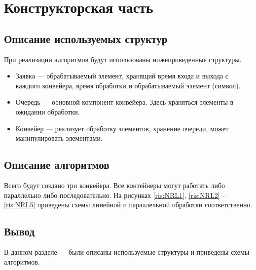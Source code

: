\chapter{Конструкторская часть}

\section{Описание используемых структур}
При реализации алгоритмов будут использованы нижеприведенные структуры.
\begin{itemize}
	\item Заявка --- обрабатываемый элемент, хранящий время входа и выхода с каждого конвейера, время обработки и обрабатываемый элемент (символ).
	\item Очередь ---  основной компонент конвейера. Здесь храняться элементы в ожидании обработки.
	\item Конвейер ---  реализует обработку элементов, хранение очереди, может манипулировать элементами.
\end{itemize} 

\section{Описание алгоритмов}
Всего будут создано три конвейера. Все контейнеры могут работать либо параллельно либо последовательно.
На рисунках \ref{ris:NRL1}, \ref{ris:NRL2} -- \ref{ris:NRL5} приведены схемы линейной и параллельной обработки соответственно.  
\begin{center}	
\newpage
	\centering
	\def\svgwidth{12cm}
	
	\label{ris:NRL1}
\end{center}
\begin{center}	
	\centering
	\def\svgwidth{5cm}
	
	\label{ris:NRL2}
\end{center}
\begin{center}	
	\newpage
	\centering
	\def\svgwidth{11cm}
	
	\label{ris:NRL3}
\end{center}
\begin{center}	
	\centering
	\def\svgwidth{11cm}
	
	\label{ris:NRL4}
\end{center}
\begin{center}	
	\newpage
	\centering
	\def\svgwidth{11cm}
	
	\label{ris:NRL5}
\end{center}

\section*{Вывод}
В данном разделе --- были описаны используемые структуры и приведены схемы алгоритмов.